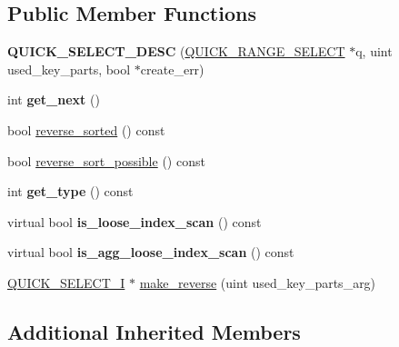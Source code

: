 \subsection*{Public Member Functions}
\begin{DoxyCompactItemize}
\item 
\mbox{\label{classQUICK__SELECT__DESC_ac5f6963e36ad6260bf2a4489eb07153d}} 
{\bfseries Q\+U\+I\+C\+K\+\_\+\+S\+E\+L\+E\+C\+T\+\_\+\+D\+E\+SC} (\mbox{\hyperlink{classQUICK__RANGE__SELECT}{Q\+U\+I\+C\+K\+\_\+\+R\+A\+N\+G\+E\+\_\+\+S\+E\+L\+E\+CT}} $\ast$q, uint used\+\_\+key\+\_\+parts, bool $\ast$create\+\_\+err)
\item 
\mbox{\label{classQUICK__SELECT__DESC_aa48553e3d4b0c24195fbc9d7f7afaad4}} 
int {\bfseries get\+\_\+next} ()
\item 
bool \mbox{\hyperlink{classQUICK__SELECT__DESC_a1f9448b2def7b3aba93f9fbeee99a1cb}{reverse\+\_\+sorted}} () const
\item 
bool \mbox{\hyperlink{classQUICK__SELECT__DESC_a2ac3395790181ce6e03646506650db69}{reverse\+\_\+sort\+\_\+possible}} () const
\item 
\mbox{\label{classQUICK__SELECT__DESC_ac9dd526dc09bcf5d8f803ba7b2ba4f58}} 
int {\bfseries get\+\_\+type} () const
\item 
\mbox{\label{classQUICK__SELECT__DESC_aa8ee8e3f50e0ce5e84ffb30875687ce5}} 
virtual bool {\bfseries is\+\_\+loose\+\_\+index\+\_\+scan} () const
\item 
\mbox{\label{classQUICK__SELECT__DESC_a4296f0c56be91add830d55e21693566b}} 
virtual bool {\bfseries is\+\_\+agg\+\_\+loose\+\_\+index\+\_\+scan} () const
\item 
\mbox{\hyperlink{classQUICK__SELECT__I}{Q\+U\+I\+C\+K\+\_\+\+S\+E\+L\+E\+C\+T\+\_\+I}} $\ast$ \mbox{\hyperlink{classQUICK__SELECT__DESC_a6ba03676b457b888636ee10c8a77bf7e}{make\+\_\+reverse}} (uint used\+\_\+key\+\_\+parts\+\_\+arg)
\end{DoxyCompactItemize}
\subsection*{Additional Inherited Members}


